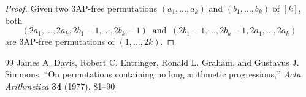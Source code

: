 \documentclass[10pt,a4paper]{amsart}
\begin{document}
\begin{proof}
Given two $3$AP-free permutations $(a_1,\dots, a_k)$ and 
$(b_1,\dots,b_k)$ of $[k]$,
both $$(2a_1,\dots,2a_k,2b_1-1,\dots,2b_k-1)
\;\;\text{and}\;\; 
(2b_1-1, \dots, 2b_k-1, 2a_1, \dots, 2a_k)$$
are $3$AP-free permutations of $(1,\dots,2k)$.
\end{proof}

\begin{thebibliography}{99}
 James A. Davis, Robert C. Entringer, Ronald L. Graham, and Gustavus J. Simmons, ``On permutations containing no long arithmetic progressions,'' \textsl{Acta Arithmetica} \textbf{34} (1977), 81--90
\end{thebibliography}
\end{document}
